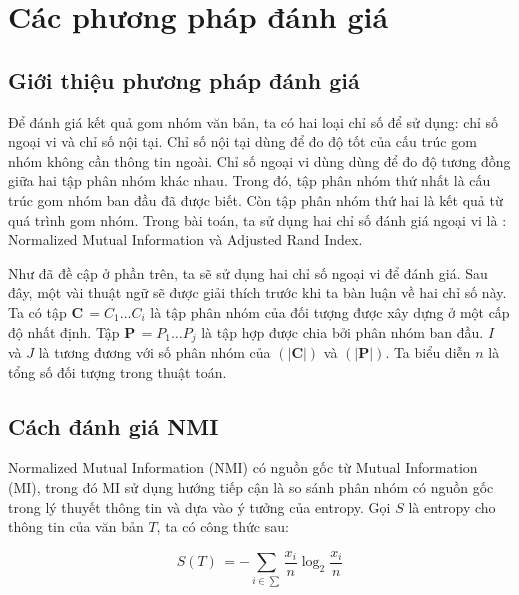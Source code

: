 
\section{Các phương pháp đánh giá}

\subsection{Giới thiệu phương pháp đánh giá}
Để đánh giá kết quả gom nhóm văn bản, ta có hai loại chỉ số để sử dụng: chỉ số ngoại vi và chỉ số nội tại.
Chỉ số nội tại dùng để đo độ tốt của cấu trúc gom nhóm không cần thông tin ngoài.
Chỉ số ngoại vi dùng dùng để đo độ tương đồng giữa hai tập phân nhóm khác nhau.
Trong đó, tập phân nhóm thứ nhất là cấu trúc gom nhóm ban đầu đã được biết.
Còn tập phân nhóm thứ hai là kết quả từ quá trình gom nhóm.
Trong bài toán, ta sử dụng hai chỉ số đánh giá ngoại vi là : Normalized Mutual Information và Adjusted Rand Index.
	
Như đã đề cập ở phần trên, ta sẽ sử dụng hai chỉ số ngoại vi để đánh giá.
Sau đây, một vài thuật ngữ sẽ được giải thích trước khi ta bàn luận về hai chỉ số này.
Ta có tập $\textbf{C} \, = {C_1 \ldots C_i}$ là tập phân nhóm của đối tượng được xây dựng ở một cấp độ nhất định.
Tập $\textbf{P} \, = {P_1 \ldots P_j}$ là tập hợp được chia bởi phân nhóm ban đầu.
$I$ và $J$ là tương đương với số phân nhóm của $(|\textbf{C}|)$ và $(|\textbf{P}|)$.
Ta biểu diễn $n$ là tổng số đối tượng trong thuật toán.

\subsection{Cách đánh giá NMI}

Normalized Mutual Information (NMI) có nguồn gốc từ Mutual Information (MI), trong đó MI sử dụng hướng tiếp cận là so sánh phân nhóm có nguồn gốc trong lý thuyết thông tin và dựa vào ý tưởng của entropy.
Gọi $S$ là entropy cho thông tin của văn bản $T$, ta có công thức sau:
\begin{center}
\begin{equation}
S(T) \, = -\sum_{i \in \sum} \frac{x_i}{n} \log_2 \frac{x_i}{n}
\end{equation}
\end{center}

